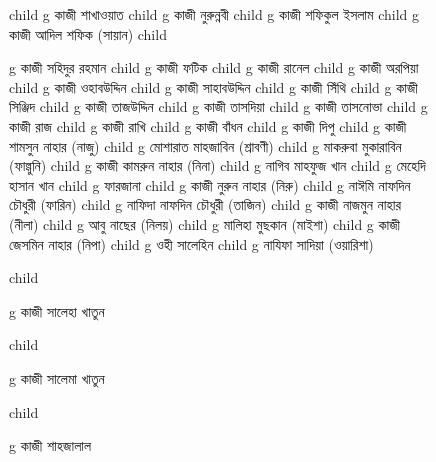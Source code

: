\documentclass{article}
\begin{document}
\begin{figure}
{\begin{genealogypicture}
{{{{{        }%
        child{
          g{ কাজী শাখাওয়াত  }
              child{   g{ কাজী নুরুন্নবী }  }
              child{
                g{ কাজী শফিকুল ইসলাম } child{  g{ কাজী আদিল শফিক (সায়ান)  } } 
              }
        }%
        child{
          g{ কাজী সহিদুর রহমান}
 child{    g{ কাজী ফটিক } 
            child{    g{ কাজী রানেল }   } %
            child{    g{ কাজী অরপিয়া }   }
      }
  child{    g{ কাজী ওহাবউদ্দিন  }   }
 child{    g{ কাজী সাহাবউদ্দিন   } 
 child{    g{ কাজী সিঁথি }   }
  child{    g{ কাজী সিঞ্জিদ }   }
      }
  child{    g{ কাজী তাজউদ্দিন  } 
  child{ g{ কাজী তাসদিয়া }  }
 child{    g{ কাজী তাসনোভা }   }
  }
  child{    g{ কাজী রাজ } 
 child{    g{ কাজী রাখি  }   } %
 child{    g{ কাজী বাঁধন }   }
  }
  child{    g{ কাজী দিপু }   }
  child{    g{ কাজী শামসুন নাহার (নাজু)  } 
        child{ g{ মোশারাত মাহজাবিন (শ্রাবণী) }  }
        child{ g{ মাকরুবা মুকারাবিন (ফাল্গুনি) }  }
  }
  child{    g{ কাজী কামরুন নাহার (নিনা) } 
      child{ g{  নাগিব মাহফুজ খান  }  }
      child{ g{  মেহেদি হাসান খান }  }
      child{ g{  ফারজানা }  }
    }
  child{    g{ কাজী নুরুন নাহার (নিরু) }  
          child{ g{ নাঈমি নাফদিন চৌধুরী (ফারিন) }  }
          child{ g{ নাফিদা নাফদিন চৌধুরী (তাজিন) }  }
   }
  child{    g{ কাজী নাজমুন নাহার (নীলা) }
        child{ g{ আবু নাছের (নিলয়) }  }
        child{ g{  মালিহা মুছকান (মাইশা)}  }
     }
  child{    g{ কাজী জেসমিন নাহার (নিপা)  } 
        child{ g{ ওহী সালেহিন  }  }
        child{ g{ নাযিফা সাদিয়া (ওয়ারিশা) }  }
    }
 

        }%
        child{
          g{ কাজী সালেহা খাতুন }

        }%
        child{
          g{ কাজী সালেমা খাতুন }

        }%
        child{
          g{ কাজী শাহজালাল }

}}}}}
\end{genealogypicture}}
\end{figure}
\end{document}
